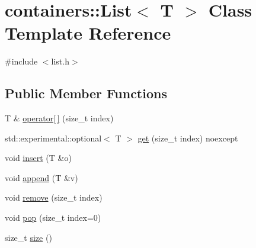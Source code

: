 \hypertarget{classcontainers_1_1_list}{}\section{containers\+:\+:List$<$ T $>$ Class Template Reference}
\label{classcontainers_1_1_list}


{\ttfamily \#include $<$list.\+h$>$}

\subsection*{Public Member Functions}
\begin{DoxyCompactItemize}
\item 
T \& \hyperlink{classcontainers_1_1_list_ad3b0886c4fe5c1d62f466ade98d02b9a}{operator\mbox{[}$\,$\mbox{]}} (size\+\_\+t index)
\item 
std\+::experimental\+::optional$<$ T $>$ \hyperlink{classcontainers_1_1_list_a3b0510ea498d73a1984dbcb3e06335d9}{get} (size\+\_\+t index) noexcept
\item 
void \hyperlink{classcontainers_1_1_list_abea32f6ba898dde0359e221c0a89c32f}{insert} (T \&o)
\item 
void \hyperlink{classcontainers_1_1_list_a9735132533e43ccf82fe0c6b2f54221b}{append} (T \&v)
\item 
void \hyperlink{classcontainers_1_1_list_a39a750f3454f840c0a7c60c6efa03c12}{remove} (size\+\_\+t index)
\item 
void \hyperlink{classcontainers_1_1_list_a533da87ddf7ccd825e80fffa2ff73437}{pop} (size\+\_\+t index=0)
\item 
size\+\_\+t \hyperlink{classcontainers_1_1_list_a9b1cb61c1a73150a8da3eb576eeb812a}{size} ()
\end{DoxyCompactItemize}
